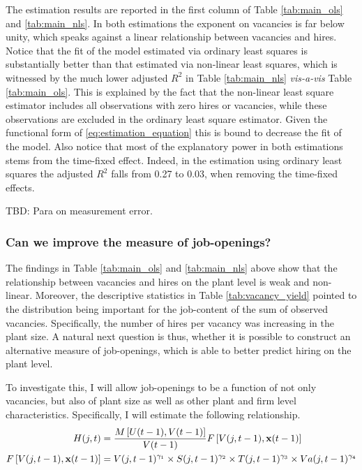 The estimation results are reported in the first column of Table \ref{tab:main_ols} and \ref{tab:main_nls}. In both estimations the exponent on vacancies is far below unity, which speaks against a linear relationship between vacancies and hires. Notice that the fit of the model estimated via ordinary least squares is substantially better than that estimated via non-linear least squares, which is witnessed by the much lower adjusted $R^2$ in Table \ref{tab:main_nls} \emph{vis-a-vis} Table \ref{tab:main_ols}. This is explained by the fact that the non-linear least square estimator includes all observations with zero hires or vacancies, while these observations are excluded in the ordinary least square estimator. Given the functional form of \ref{eq:estimation_equation} this is bound to decrease the fit of the model. Also notice that most of the explanatory power in both estimations stems from the time-fixed effect. Indeed, in the estimation using ordinary least squares the adjusted $R^2$ falls from 0.27 to 0.03, when removing the time-fixed effects. 

TBD: Para on measurement error.

\clearpage





 
\subsubsection{Can we improve the measure of job-openings?}

The findings in Table \ref{tab:main_ols} and \ref{tab:main_nls} above show that the relationship between vacancies and hires on the plant level is weak and non-linear. Moreover, the descriptive statistics in Table \ref{tab:vacancy_yield} pointed to the distribution being important for the job-content of the sum of observed vacancies. Specifically, the number of hires per vacancy was increasing in the plant size. A natural next question is thus, whether it is possible to construct an alternative measure of job-openings, which is able to better predict hiring on the plant level. 

To investigate this, I will allow job-openings to be a function of not only vacancies, but also of plant size as well as other plant and firm level characteristics. Specifically, I will estimate the following relationship. 
\begin{align}
\tiny
H(j,t)&=\frac{M\left[U(t-1), V(t-1)\right]}{V(t-1)} F\left[ V(j,t-1), \mathbf{x}(t-1) \right] 
\label{eq:ht+1_aug} \\
F\left[V(j,t-1),\mathbf{x}(t-1)\right]&=V(j,t-1)^{\gamma_1}  \times  S(j,t-1)^{\gamma_2} \times T(j,t-1)^{\gamma_3} \times  Va(j,t-1)^{\gamma_4} \nonumber
\end{align}

